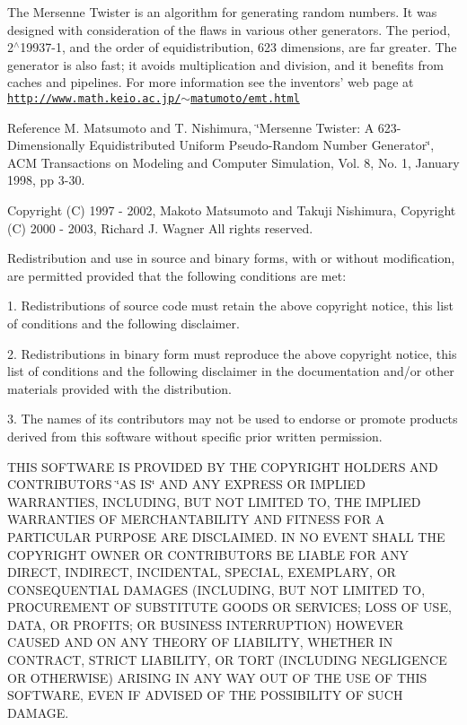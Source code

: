 The Mersenne Twister is an algorithm for generating random numbers. It was designed with consideration of the flaws in various other generators. The period, 2$^\wedge$19937-\/1, and the order of equidistribution, 623 dimensions, are far greater. The generator is also fast; it avoids multiplication and division, and it benefits from caches and pipelines. For more information see the inventors' web page at \href{http://www.math.keio.ac.jp/~matumoto/emt.html}{\tt http://www.math.keio.ac.jp/$\sim$matumoto/emt.html}

Reference M. Matsumoto and T. Nishimura, \char`\"{}Mersenne Twister: A 623-\/Dimensionally
  Equidistributed Uniform Pseudo-\/Random Number Generator\char`\"{}, ACM Transactions on Modeling and Computer Simulation, Vol. 8, No. 1, January 1998, pp 3-\/30.

Copyright (C) 1997 -\/ 2002, Makoto Matsumoto and Takuji Nishimura, Copyright (C) 2000 -\/ 2003, Richard J. Wagner All rights reserved.

Redistribution and use in source and binary forms, with or without modification, are permitted provided that the following conditions are met:

1. Redistributions of source code must retain the above copyright notice, this list of conditions and the following disclaimer.

2. Redistributions in binary form must reproduce the above copyright notice, this list of conditions and the following disclaimer in the documentation and/or other materials provided with the distribution.

3. The names of its contributors may not be used to endorse or promote products derived from this software without specific prior written permission.

THIS SOFTWARE IS PROVIDED BY THE COPYRIGHT HOLDERS AND CONTRIBUTORS \char`\"{}AS IS\char`\"{} AND ANY EXPRESS OR IMPLIED WARRANTIES, INCLUDING, BUT NOT LIMITED TO, THE IMPLIED WARRANTIES OF MERCHANTABILITY AND FITNESS FOR A PARTICULAR PURPOSE ARE DISCLAIMED. IN NO EVENT SHALL THE COPYRIGHT OWNER OR CONTRIBUTORS BE LIABLE FOR ANY DIRECT, INDIRECT, INCIDENTAL, SPECIAL, EXEMPLARY, OR CONSEQUENTIAL DAMAGES (INCLUDING, BUT NOT LIMITED TO, PROCUREMENT OF SUBSTITUTE GOODS OR SERVICES; LOSS OF USE, DATA, OR PROFITS; OR BUSINESS INTERRUPTION) HOWEVER CAUSED AND ON ANY THEORY OF LIABILITY, WHETHER IN CONTRACT, STRICT LIABILITY, OR TORT (INCLUDING NEGLIGENCE OR OTHERWISE) ARISING IN ANY WAY OUT OF THE USE OF THIS SOFTWARE, EVEN IF ADVISED OF THE POSSIBILITY OF SUCH DAMAGE.

